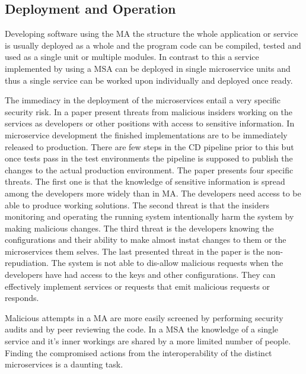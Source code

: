 \subsection{Deployment and Operation}
\begin{sloppypar}
    Developing software using the MA the structure the whole application or service 
    is usually deployed as a whole and the program code can be compiled, tested 
    and used as a single unit or multiple modules. In contrast to this a service 
    implemented by using a MSA can be deployed in single microservice units and 
    thus a single service can be worked upon individually and deployed once ready.
\end{sloppypar}
\begin{sloppypar}
    The immediacy in the deployment of the microservices entail a very specific 
    security risk. In a paper \citet{integinside} present threats from malicious 
    insiders working on the services as developers or other positions with access
    to sensitive information. In microservice development the finished 
    implementations are to be immediately released to production. There are few 
    steps in the CD pipeline prior to this but once tests pass in the test 
    environments the pipeline is supposed to publish the changes to the actual 
    production environment. The paper presents four specific threats. The first 
    one is that the knowledge of sensitive information is spread among the 
    developers more widely than in MA. The developers need access to be able to 
    produce working solutions. The second threat is that the insiders 
    monitoring and operating the running system intentionally harm the system 
    by making malicious changes. The third threat is the developers knowing the 
    configurations and their ability to make almost instat changes to them or 
    the microservices them selves. The last presented threat in the paper is the 
    non-repudiation. The system is not able to dis-allow malicious requests 
    when the developers have had access to the keys and other configurations. 
    They can effectively implement services or requests that emit malicious 
    requests or responds.
\end{sloppypar}
\begin{sloppypar}
    Malicious attempts in a MA are more easily screened by performing security
    audits and by peer reviewing the code. In a MSA the knowledge of a single 
    service and it's inner workings are shared by a more limited number of people.
    Finding the compromised actions from the interoperability of the distinct 
    microservices is a daunting task.
\end{sloppypar}
\begin{sloppypar}
    
\end{sloppypar}

